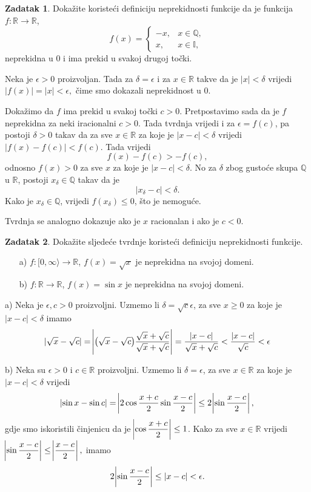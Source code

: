 \documentclass{book}
\let\originalleft\left
\let\originalright\right
\renewcommand{\left}{\mathopen{}\mathclose\bgroup\originalleft}
\renewcommand{\right}{\aftergroup\egroup\originalright}
\renewenvironment{proof}{%
    \vspace{-\parskip}\begin{oldproof}%
    }{%
    \end{oldproof}%
}
\theoremstyle{definition}
\theoremstyle{definition}
\newtheorem{exercise}{Zadatak}
\theoremstyle{remark}
\begin{document}
\begin{exercise}
Dokažite koristeći definiciju neprekidnosti funkcije da je funkcija $f : \mathbb{R}\to\mathbb{R}$,
$$f(x)=\begin{cases}
-x, & x\in \mathbb{Q},\\
x, & x\in \mathbb{I},
\end{cases}$$
neprekidna u $0$ i ima prekid u svakoj drugoj točki.
\end{exercise}
\newpage
\begin{proof}[Rješenje]
Neka je $\epsilon>0$ proizvoljan. Tada za $\delta=\epsilon$ i za $x\in \mathbb{R}$ takve da je $|x|<\delta$ vrijedi $|f(x)|=|x|<\epsilon,$ čime smo dokazali neprekidnost u $0$.

Dokažimo da $f$ ima prekid u svakoj točki $c>0$. Pretpostavimo sada da je $f$ neprekidna za neki iracionalni $c>0$. Tada tvrdnja vrijedi i za $\epsilon=f(c)$, pa postoji $\delta>0$ takav da za sve $x\in \mathbb{R}$ za koje je $|x-c|<\delta$ vrijedi $|f(x)-f(c)|<f(c)$. Tada vrijedi $$f(x)-f(c)>-f(c),$$ odnosno $f(x)>0$ za sve $x$ za koje je $|x-c|<\delta$. No za $\delta$ zbog gustoće skupa $\mathbb{Q}$ u $\mathbb{R}$, postoji $x_\delta\in \mathbb{Q}$ takav da je $$|x_\delta-c|<\delta.$$ Kako je $x_\delta\in \mathbb{Q}$, vrijedi $f(x_\delta)\leq 0$, što je nemoguće. 

Tvrdnja se analogno dokazuje ako je $x$ racionalan i ako je $c<0$.
\end{proof}
\begin{exercise}
\label{cont4}
Dokažite sljedeće tvrdnje koristeći definiciju neprekidnosti funkcije. 
\begin{itemize}
\item[a)] $f : [0,\infty \rangle\to \mathbb{R}$, $f(x)=\sqrt{x}$ je neprekidna na svojoj domeni.
\item[b)] $f : \mathbb{R} \to \mathbb{R}$, $f(x)=\sin{x}$ je neprekidna na svojoj domeni.
\end{itemize}
\end{exercise}
\begin{proof}[Rješenje]
a) Neka je $\epsilon, c>0$ proizvoljni. Uzmemo li $\delta=\sqrt{c}\epsilon$, za sve $x\geq 0$ za koje je $|x-c|<\delta$ imamo
$$|\sqrt{x}-\sqrt{c}|=\abs{\left(\sqrt{x}-\sqrt{c}\right)\dfrac{\sqrt{x}+\sqrt{c}}{\sqrt{x}+\sqrt{c}}}=\dfrac{|x-c|}{\sqrt{x}+\sqrt{c}}<\dfrac{|x-c|}{\sqrt{c}}<\epsilon$$

b) Neka su $\epsilon>0$ i $c\in \mathbb{R}$ proizvoljni. Uzmemo li $\delta=\epsilon$, za sve $x\in \mathbb{R}$ za koje je $|x-c|<\delta$ vrijedi
$$\abs{\sin{x}-\sin{c}}=\abs{2\cos{\dfrac{x+c}{2}}\sin{\dfrac{x-c}{2}}}\leq 2\abs{\sin{\dfrac{x-c}{2}}},$$
gdje smo iskoristili činjenicu da je $\abs{\cos{\dfrac{x+c}{2}}}\leq 1$. Kako za sve $x\in \mathbb{R}$ vrijedi $\abs{\sin{\dfrac{x-c}{2}}}\leq \abs{\dfrac{x-c}{2}},$ imamo $$2\abs{\sin{\dfrac{x-c}{2}}}\leq |x-c|<\epsilon.$$
\end{proof}
\end{document}
